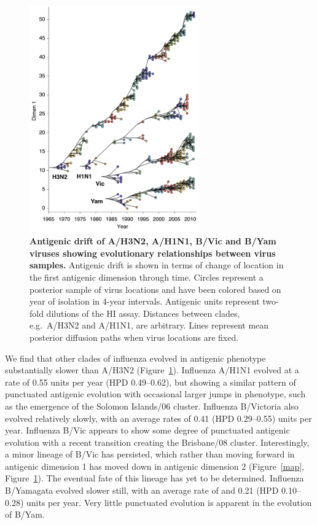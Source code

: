\documentclass[11pt,oneside,letterpaper]{article}
\begin{document}
\begin{figure}[h]
	\centering		
	\includegraphics[width=0.65\textwidth]{figures/drift}
	\caption{\textbf{Antigenic drift of A/H3N2, A/H1N1, B/Vic and B/Yam viruses showing evolutionary relationships between virus samples.} 
	Antigenic drift is shown in terms of change of location in the first antigenic dimension through time.
	Circles represent a posterior sample of virus locations and have been colored based on year of isolation in 4-year intervals.
	Antigenic units represent two-fold dilutions of the HI assay.
	Distances between clades, e.g.\ A/H3N2 and A/H1N1, are arbitrary.
	Lines represent mean posterior diffusion paths when virus locations are fixed.} 
	\label{drift} 
\end{figure}

We find that other clades of influenza evolved in antigenic phenotype substantially slower than A/H3N2 (Figure~\ref{drift}).
Influenza A/H1N1 evolved at a rate of 0.55 units per year (HPD 0.49--0.62), but showing a similar pattern of punctuated antigenic evolution with occasional larger jumps in phenotype, such as the emergence of the Solomon Islands/06 cluster.  
Influenza B/Victoria also evolved relatively slowly, with an average rates of 0.41 (HPD 0.29--0.55) units per year.
Influenza B/Vic appears to show some degree of punctuated antigenic evolution with a recent transition creating the Brisbane/08 cluster.
Interestingly, a minor lineage of B/Vic has persisted, which rather than moving forward in antigenic dimension 1 has moved down in antigenic dimension 2 (Figure~\ref{map}, Figure~\ref{drift}).
The eventual fate of this lineage has yet to be determined.
Influenza B/Yamagata evolved slower still, with an average rate of and 0.21 (HPD 0.10--0.28) units per year.
Very little punctuated evolution is apparent in the evolution of B/Yam.
\end{document}
